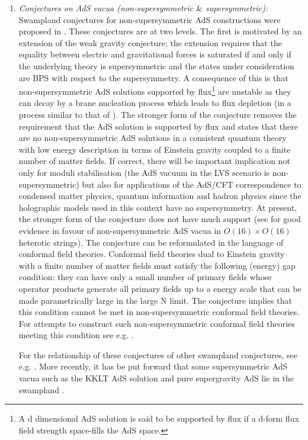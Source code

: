 \begin{enumerate}
\item{\it Conjectures on  AdS vacua (non-supersymmetric $\&$ supersymmetric):}  Swampland conjectures for non-supersymmetric AdS constructions were proposed in
\cite{Ooguri:2016pdq}. These conjectures are at two levels. The first is motivated by an extension of the weak gravity conjecture; the extension requires that
the equality between electric and gravitational forces is saturated  if and only if the underlying theory is supersymmetric and the states
 under consideration are BPS with respect to the supersymmetry. A consequence of this is that non-supersymmetric AdS solutions supported
 by flux\footnote{A d dimensional AdS solution is said to be supported by flux if a d-form flux field strength   space-fills the AdS space.}  are unstable as they can decay by a brane nucleation process which leads to flux depletion (in a process similar
 to that of \cite{Maldacena:1998uz}). The stronger form of the conjecture removes the requirement that the AdS solution is supported by
 flux and states that  there are no non-supersymmetric AdS solutions in a consistent quantum theory with low energy description in terms of Einstein gravity coupled to a finite number of matter fields. If correct, there will be important  implication not only for moduli stabilisation
 (the AdS vacuum in the LVS scenario is non-supersymmetric) but also for applications of the AdS/CFT correspondence to condensed matter physics, quantum information and hadron physics since the holographic models used in this context have no supersymmetry.  At present, the stronger form of the conjecture does not have much support (see \cite{Baykara:2022cwj} for good evidence in favour of non-supersymmetric AdS vacua in $O(16) \times O(16)$
 heterotic strings). The conjecture can be reformulated in the language of conformal field theories. Conformal field theories dual to Einstein gravity with a finite number of matter fields must satisfy the following (energy) gap condition: they  can have  only a small number of primary fields whose operator products generate all primary fields up to a  energy scale that can be  made parametrically large in the large N limit. The conjecture implies that this condition cannot be met in non-supersymmetric conformal field theories. For attempts to construct such non-supersymmetric conformal field theories meeting this condition see e.g. \cite{Giombi:2017mxl, Gurucharan:2014cva}. 
 
For the relationship of these conjectures of other swampland conjectures, see e.g. \cite{Bernardo:2021vfw}. More recently, it has be put forward that  some  supersymmetric AdS  vacua such as the KKLT AdS solution and pure supergravity AdS lie in the swampland \cite{Lust:2022lfc, Montero:2022ghl}.





\end{enumerate}
